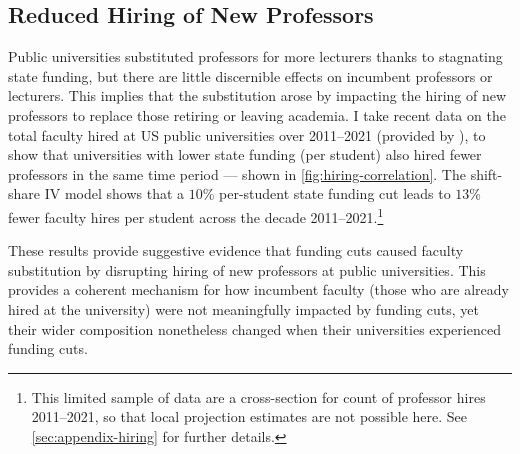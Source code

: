 \subsection{Reduced Hiring of New Professors}
Public universities substituted professors for more lecturers thanks to stagnating state funding, but there are little discernible effects on incumbent professors or lecturers.
This implies that the substitution arose by impacting the hiring of new professors to replace those retiring or leaving academia.
I take recent data on the total faculty hired at US public universities over 2011--2021 (provided by \citealt{wapman2022quantifying,wapman2022zenodo}), to show that universities with lower state funding (per student) also hired fewer professors in the same time period --- shown in \autoref{fig:hiring-correlation}.
The shift-share IV model shows that a $10$\% per-student state funding cut leads to $13$\% fewer faculty hires per student across the decade 2011--2021.\footnote{
    This limited sample of data are a cross-section for count of professor hires 2011--2021, so that local projection estimates are not possible here.
    See \autoref{sec:appendix-hiring} for further details.
}

These results provide suggestive evidence that funding cuts caused faculty substitution by disrupting hiring of new professors at public universities.
This provides a coherent mechanism for how incumbent faculty (those who are already hired at the university) were not meaningfully impacted by funding cuts, yet their wider composition nonetheless changed when their universities experienced funding cuts. 

